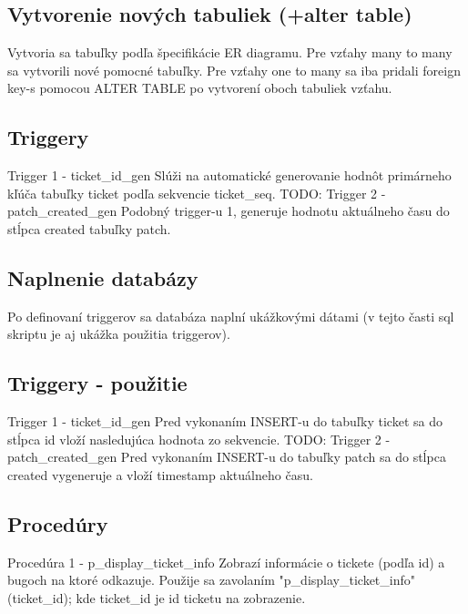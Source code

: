 \documentclass[11pt, a4paper]{article}
\begin{document}
    \subsection{Vytvorenie nových tabuliek (+alter table)}\label{subsec:vytvorenie-nových-tabulieknull+alter-tablenull}

    Vytvoria sa tabuľky podľa špecifikácie ER diagramu.
    Pre vzťahy many to many sa vytvorili nové pomocné tabuľky.
    Pre vzťahy one to many sa iba pridali foreign key-s pomocou ALTER TABLE po vytvorení oboch tabuliek vzťahu.

    \subsection{Triggery}\label{subsec:triggery}

    Trigger 1 - ticket\_id\_gen
    Slúži na automatické generovanie hodnôt primárneho kľúča tabuľky ticket podľa sekvencie ticket\_seq.
    TODO: Trigger 2 - patch\_created\_gen
    Podobný trigger-u 1, generuje hodnotu aktuálneho času do stĺpca created tabuľky patch.

    \subsection{Naplnenie databázy}\label{subsec:naplnenie-databázy}

    Po definovaní triggerov sa databáza naplní ukážkovými dátami (v tejto časti sql skriptu je aj ukážka použitia triggerov).

    \subsection{Triggery - použitie}\label{subsec:triggery---použitie}

    Trigger 1 - ticket\_id\_gen
    Pred vykonaním INSERT-u do tabuľky ticket sa do stĺpca id vloží nasledujúca hodnota zo sekvencie.
    TODO: Trigger 2 - patch\_created\_gen
    Pred vykonaním INSERT-u do tabuľky patch sa do stĺpca created vygeneruje a vloží timestamp aktuálneho času.

    \subsection{Procedúry}\label{subsec:procedúry}

    Procedúra 1 - p\_display\_ticket\_info
    Zobrazí informácie o tickete (podľa id) a bugoch na ktoré odkazuje.
    Použije sa zavolaním "p\_display\_ticket\_info"(ticket\_id); kde ticket\_id je id ticketu na zobrazenie.
\end{document}
